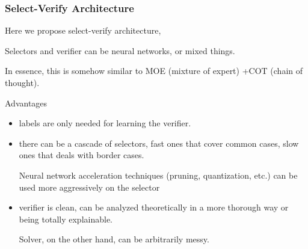 \documentclass{beamer}   	%
\theoremstyle{definition}
\begin{document}
\begin{frame}
\frametitle{Select-Verify Architecture}

Here we propose select-verify architecture,
\begin{center}
\end{center}

Selectors and verifier can be neural networks, or mixed things.

In essence, this is somehow similar to MOE (mixture of expert) +COT (chain of thought).

\end{frame}

\begin{frame}
Advantages
\begin{itemize}
	\item labels are only needed for learning the verifier.
	\item there can be a cascade of selectors, fast ones that cover common cases, slow ones that deals with border cases.

	Neural network acceleration techniques (pruning, quantization, etc.) can be used more aggressively on the selector
	\item verifier is clean, can be analyzed theoretically in a more thorough way or being totally explainable.

	Solver, on the other hand, can be arbitrarily messy.
\end{itemize}
\end{frame}
\end{document}
